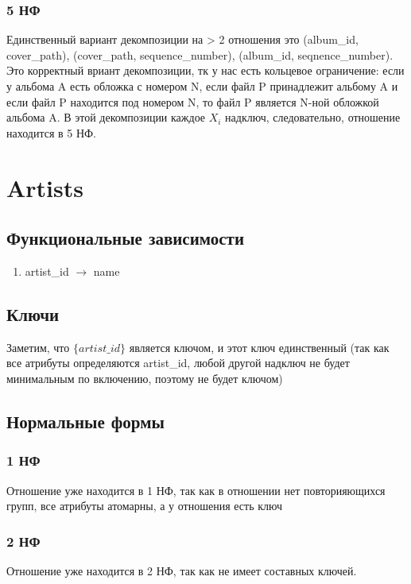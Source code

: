 \documentclass{article}
\begin{document}
\subsubsection{5 НФ}
Единственный вариант декомпозиции на > 2 отношения это (album\_id, cover\_path), (cover\_path, sequence\_number), (album\_id, seqnence\_number). Это корректный вриант декомпозиции, тк у нас есть кольцевое ограничение: если у альбома A есть обложка с номером N, если файл P принадлежит альбому A и если файл P находится под номером N, то файл P является N-ной обложкой альбома A. В этой декомпозиции каждое $X_i$ надключ, следовательно, отношение находится в 5 НФ.


\section{Artists}

\subsection{Функциональные зависимости}
\begin{enumerate}
	\item artist\_id $\rightarrow$ name
\end{enumerate}

\subsection{Ключи}
Заметим, что $\{artist\_id\}$ является ключом, и этот ключ единственный (так как все атрибуты определяются artist\_id, любой другой надключ не будет минимальным по включению, поэтому не будет ключом)

\subsection{Нормальные формы}

\subsubsection{1 НФ}

Отношение уже находится в 1 НФ, так как в отношении нет повторияющихся групп, все атрибуты атомарны, а у отношения есть ключ

\subsubsection{2 НФ}

Отношение уже находится в 2 НФ, так как не имеет составных ключей.
\end{document}
